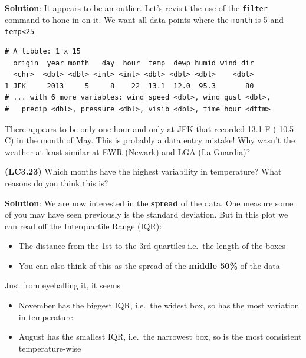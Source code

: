 \documentclass[12pt,]{krantz}
\makeatletter
\newenvironment{Shaded}{\begin{snugshade}}{\end{snugshade}}
\newcommand{\KeywordTok}[1]{\textcolor[rgb]{0.27,0.27,0.27}{\textbf{#1}}}
\newcommand{\DecValTok}[1]{\textcolor[rgb]{0.06,0.06,0.06}{#1}}
\newcommand{\StringTok}[1]{\textcolor[rgb]{0.5,0.5,0.5}{#1}}
\newcommand{\OperatorTok}[1]{\textcolor[rgb]{0.43,0.43,0.43}{\textbf{#1}}}
\newcommand{\NormalTok}[1]{#1}
\providecommand{\tightlist}{%
  \setlength{\itemsep}{0pt}\setlength{\parskip}{0pt}}
\newenvironment{kframe}{%
\medskip{}
\setlength{\fboxsep}{.8em}
 \def\at@end@of@kframe{}%
 \ifinner\ifhmode%
  \def\at@end@of@kframe{\end{minipage}}%
  \begin{minipage}{\columnwidth}%
 \fi\fi%
 \def\FrameCommand##1{\hskip\@totalleftmargin \hskip-\fboxsep
 \colorbox{shadecolor}{##1}\hskip-\fboxsep
     \hskip-\linewidth \hskip-\@totalleftmargin \hskip\columnwidth}%
 \MakeFramed {\advance\hsize-\width
   \@totalleftmargin\z@ \linewidth\hsize
   \@setminipage}}%
 {\par\unskip\endMakeFramed%
 \at@end@of@kframe}
\renewenvironment{Shaded}{\begin{kframe}}{\end{kframe}}
\theoremstyle{definition}
\theoremstyle{definition}
\theoremstyle{definition}
\theoremstyle{remark}
\makeatother
\begin{document}
\textbf{Solution}: It appears to be an outlier. Let's revisit the use of
the \texttt{filter} command to hone in on it. We want all data points
where the \texttt{month} is 5 and \texttt{temp\textless{}25}

\begin{Shaded}
\end{Shaded}

\begin{verbatim}
# A tibble: 1 x 15
  origin  year month   day  hour  temp  dewp humid wind_dir
  <chr>  <dbl> <dbl> <int> <int> <dbl> <dbl> <dbl>    <dbl>
1 JFK     2013     5     8    22  13.1  12.0  95.3       80
# ... with 6 more variables: wind_speed <dbl>, wind_gust <dbl>,
#   precip <dbl>, pressure <dbl>, visib <dbl>, time_hour <dttm>
\end{verbatim}

There appears to be only one hour and only at JFK that recorded 13.1 F
(-10.5 C) in the month of May. This is probably a data entry mistake!
Why wasn't the weather at least similar at EWR (Newark) and LGA (La
Guardia)?

\textbf{(LC3.23)} Which months have the highest variability in
temperature? What reasons do you think this is?

\textbf{Solution}: We are now interested in the \textbf{spread} of the
data. One measure some of you may have seen previously is the standard
deviation. But in this plot we can read off the Interquartile Range
(IQR):

\begin{itemize}
\tightlist
\item
  The distance from the 1st to the 3rd quartiles i.e.~the length of the
  boxes
\item
  You can also think of this as the spread of the \textbf{middle 50\%}
  of the data
\end{itemize}

Just from eyeballing it, it seems

\begin{itemize}
\tightlist
\item
  November has the biggest IQR, i.e.~the widest box, so has the most
  variation in temperature
\item
  August has the smallest IQR, i.e.~the narrowest box, so is the most
  consistent temperature-wise
\end{itemize}
\end{document}
